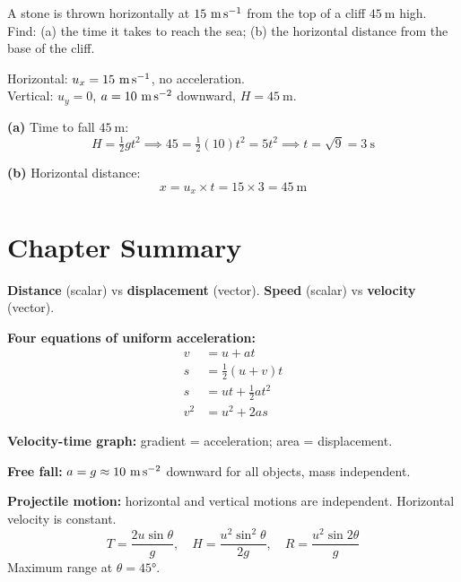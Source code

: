 \begin{examplebox}[3.7]
A stone is thrown horizontally at $15\ \text{m\,s}^{-1}$
from the top of a cliff $45\ \text{m}$ high.
Find: (a) the time it takes to reach the sea;
(b) the horizontal distance from the base of the cliff.
\end{examplebox}

\begin{solutionbox}
Horizontal: $u_x = 15\ \text{m\,s}^{-1}$, no acceleration.\\
Vertical: $u_y = 0$, $a = 10\ \text{m\,s}^{-2}$ downward,
$H = 45\ \text{m}$.

\textbf{(a)} Time to fall $45\ \text{m}$:
\[
  H = \tfrac{1}{2}gt^2
  \implies 45 = \tfrac{1}{2}(10)t^2
  = 5t^2
  \implies t = \sqrt{9} = 3\ \text{s}
\]

\textbf{(b)} Horizontal distance:
\[
  x = u_x \times t = 15 \times 3 = 45\ \text{m}
\]
\end{solutionbox}

\vspace{3.3cm}

\section{Chapter Summary}

\begin{summarybox}

\textbf{Distance} (scalar) vs \textbf{displacement}
(vector). \textbf{Speed} (scalar) vs \textbf{velocity}
(vector).

\vspace{0.3cm}

\textbf{Four equations of uniform acceleration:}
\begin{align*}
  v &= u + at\\
  s &= \tfrac{1}{2}(u+v)t\\
  s &= ut + \tfrac{1}{2}at^2\\
  v^2 &= u^2 + 2as
\end{align*}

\textbf{Velocity-time graph:}
gradient = acceleration; area = displacement.

\textbf{Free fall:} $a = g \approx 10\ \text{m\,s}^{-2}$
downward for all objects, mass independent.

\textbf{Projectile motion:} horizontal and vertical
motions are independent. Horizontal velocity is constant.
\[
  T = \frac{2u\sin\theta}{g}, \quad
  H = \frac{u^2\sin^2\theta}{2g}, \quad
  R = \frac{u^2\sin 2\theta}{g}
\]
Maximum range at $\theta = 45°$.

\end{summarybox}

